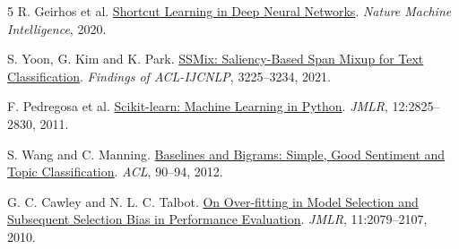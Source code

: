 \begin{thebibliography}{5}
R. Geirhos et al.
\href{https://doi.org/10.1038/s42256-020-00257-z}{Shortcut Learning in Deep Neural Networks}.
\emph{Nature Machine Intelligence}, 2020.

S. Yoon, G. Kim and K. Park.
\href{https://aclanthology.org/2021.findings-acl.285/}{SSMix: Saliency-Based Span Mixup for Text Classification}.
\emph{Findings of ACL-IJCNLP}, 3225--3234, 2021.

F. Pedregosa et al.
\href{https://jmlr.org/papers/v12/pedregosa11a.html}{Scikit-learn: Machine Learning in Python}.
\emph{JMLR}, 12:2825--2830, 2011.

S. Wang and C. Manning.
\href{https://aclanthology.org/P12-2018/}{Baselines and Bigrams: Simple, Good Sentiment and Topic Classification}.
\emph{ACL}, 90--94, 2012.

G. C. Cawley and N. L. C. Talbot.
\href{https://jmlr.org/papers/v11/cawley10a.html}{On Over-fitting in Model Selection and Subsequent Selection Bias in Performance Evaluation}.
\emph{JMLR}, 11:2079--2107, 2010.
\end{thebibliography}
